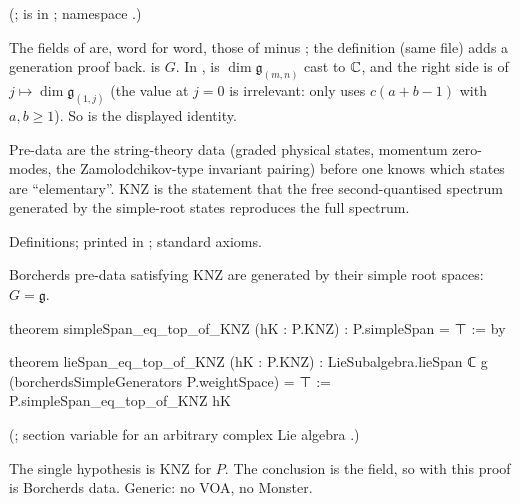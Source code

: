 (;\newline {} is in
; namespace .)
\begin{dictionary}
The fields of  are, word for word, those of  minus ; the
definition  (same file) adds a generation proof back.   is $G$.  In ,
 is $\dim\mathfrak g_{(m,n)}$ cast to ${\mathbb{C}}$, and the right side is
 of $j\mapsto\dim\mathfrak g_{(1,j)}$ (the value at $j=0$ is irrelevant:  only uses
$c(a+b-1)$ with $a,b\ge1$).  So  is the displayed identity.
\end{dictionary}
\begin{physics}
Pre-data are the string-theory data (graded physical states, momentum zero-modes, the Zamolodchikov-type invariant pairing)
before one knows which states are ``elementary''.  KNZ is the statement that the free second-quantised spectrum generated by
the simple-root states reproduces the full spectrum.
\end{physics}
\begin{status}
Definitions; printed in ; standard axioms.
\end{status}

\begin{theorem}\label{ch20:thm:genKNZ}
Borcherds pre-data satisfying KNZ are generated by their simple root spaces: $G=\mathfrak g$.
\end{theorem}
\begin{leancode}
theorem simpleSpan_eq_top_of_KNZ (hK : P.KNZ) : P.simpleSpan = ⊤ := by

theorem lieSpan_eq_top_of_KNZ (hK : P.KNZ) :
    LieSubalgebra.lieSpan ℂ g (borcherdsSimpleGenerators P.weightSpace) = ⊤ :=
  P.simpleSpan_eq_top_of_KNZ hK
\end{leancode}
(; section variable  for an
arbitrary complex Lie algebra .)
\begin{dictionary}
The single hypothesis  is KNZ for $P$.  The conclusion is the  field, so  with this
proof is Borcherds data.  Generic: no VOA, no Monster.
\end{dictionary}

